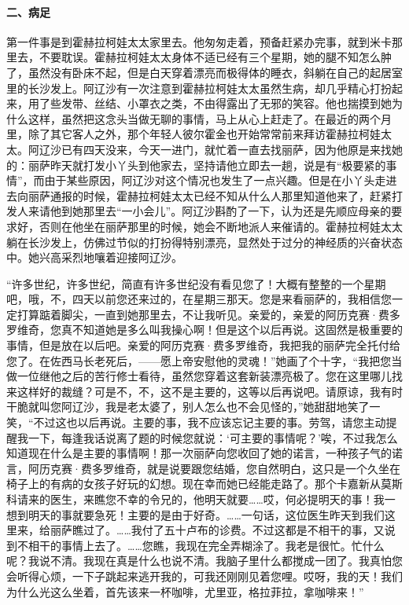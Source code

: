 \paragraph*{二、病足}
\par 第一件事是到霍赫拉柯娃太太家里去。他匆匆走着，预备赶紧办完事，就到米卡那里去，不要耽误。霍赫拉柯娃太太身体不适已经有三个星期，她的腿不知怎么肿了，虽然没有卧床不起，但是白天穿着漂亮而极得体的睡衣，斜躺在自己的起居室里的长沙发上。阿辽沙有一次注意到霍赫拉柯娃太太虽然生病，却几乎精心打扮起来，用了些发带、丝结、小罩衣之类，不由得露出了无邪的笑容。他也揣摸到她为什么这样，虽然把这念头当做无聊的事情，马上从心上赶走了。在最近的两个月里，除了其它客人之外，那个年轻人彼尔霍金也开始常常前来拜访霍赫拉柯娃太太。阿辽沙已有四天没来，今天一进门，就忙着一直去找丽萨，因为他原是来找她的：丽萨昨天就打发小丫头到他家去，坚持请他立即去一趟，说是有“极要紧的事情”，而由于某些原因，阿辽沙对这个情况也发生了一点兴趣。但是在小丫头走进去向丽萨通报的时候，霍赫拉柯娃太太已经不知从什么人那里知道他来了，赶紧打发人来请他到她那里去“一小会儿”。阿辽沙斟酌了一下，认为还是先顺应母亲的要求好，否则在他坐在丽萨那里的时候，她会不断地派人来催请的。霍赫拉柯娃太太躺在长沙发上，仿佛过节似的打扮得特别漂亮，显然处于过分的神经质的兴奋状态中。她兴高采烈地嚷着迎接阿辽沙。
\par “许多世纪，许多世纪，简直有许多世纪没有看见您了！大概有整整的一个星期吧，哦，不，四天以前您还来过的，在星期三那天。您是来看丽萨的，我相信您一定打算踮着脚尖，一直到她那里去，不让我听见。亲爱的，亲爱的阿历克赛·费多罗维奇，您真不知道她是多么叫我操心啊！但是这个以后再说。这固然是极重要的事情，但是放在以后吧。亲爱的阿历克赛·费多罗维奇，我把我的丽萨完全托付给您了。在佐西马长老死后，——愿上帝安慰他的灵魂！”她画了个十字，“我把您当做一位继他之后的苦行修士看待，虽然您穿着这套新装漂亮极了。您在这里哪儿找来这样好的裁缝？可是不，不，这不是主要的，这等以后再说吧。请原谅，我有时干脆就叫您阿辽沙，我是老太婆了，别人怎么也不会见怪的，”她甜甜地笑了一笑，“不过这也以后再说。主要的事，我不应该忘记主要的事。劳驾，请您主动提醒我一下，每逢我话说离了题的时候您就说：‘可主要的事情呢？’唉，不过我怎么知道现在什么是主要的事情啊！那一次丽萨向您收回了她的诺言，一种孩子气的诺言，阿历克赛·费多罗维奇，就是说要跟您结婚，您自然明白，这只是一个久坐在椅子上的有病的女孩子好玩的幻想。现在幸而她已经能走路了。那个卡嘉新从莫斯科请来的医生，来瞧您不幸的令兄的，他明天就要……哎，何必提明天的事！我一想到明天的事就要急死！主要的是由于好奇。……一句话，这位医生昨天到我们这里来，给丽萨瞧过了。……我付了五十卢布的诊费。不过这都是不相干的事，又说到不相干的事情上去了。……您瞧，我现在完全弄糊涂了。我老是很忙。忙什么呢？我说不清。我现在真是什么也说不清。我脑子里什么都搅成一团了。我真怕您会听得心烦，一下子跳起来逃开我的，可我还刚刚见着您哩。哎呀，我的天！我们为什么光这么坐着，首先该来一杯咖啡，尤里亚，格拉菲拉，拿咖啡来！”
